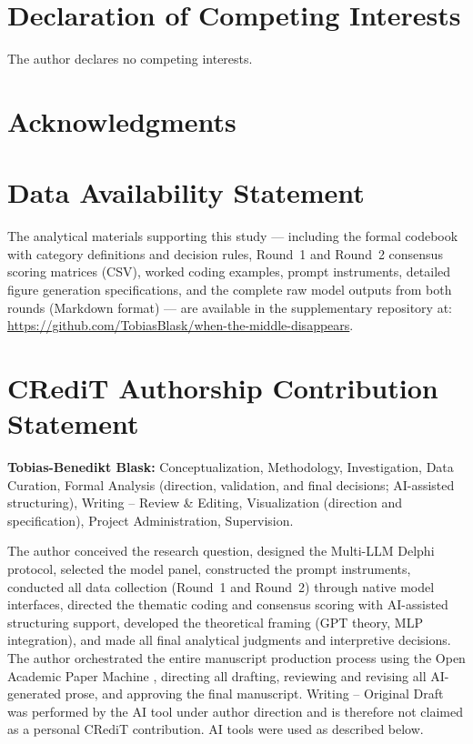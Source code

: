 \documentclass[preprint,review,12pt]{elsarticle}
\begin{document}
\section*{Declaration of Competing Interests}

The author declares no competing interests.

\section*{Acknowledgments}

\section*{Data Availability Statement}

The analytical materials supporting this study --- including the formal codebook with category definitions and decision rules, Round~1 and Round~2 consensus scoring matrices (CSV), worked coding examples, prompt instruments, detailed figure generation specifications, and the complete raw model outputs from both rounds (Markdown format) --- are available in the supplementary repository at: \url{https://github.com/TobiasBlask/when-the-middle-disappears}.

\section*{CRediT Authorship Contribution Statement}

\textbf{Tobias-Benedikt Blask:} Conceptualization, Methodology, Investigation, Data Curation, Formal Analysis (direction, validation, and final decisions; AI-assisted structuring), Writing -- Review \& Editing, Visualization (direction and specification), Project Administration, Supervision.

The author conceived the research question, designed the Multi-LLM Delphi protocol, selected the model panel, constructed the prompt instruments, conducted all data collection (Round~1 and Round~2) through native model interfaces, directed the thematic coding and consensus scoring with AI-assisted structuring support, developed the theoretical framing (GPT theory, MLP integration), and made all final analytical judgments and interpretive decisions. The author orchestrated the entire manuscript production process using the Open Academic Paper Machine \citep{blask2026openpapermachine}, directing all drafting, reviewing and revising all AI-generated prose, and approving the final manuscript. Writing -- Original Draft was performed by the AI tool under author direction and is therefore not claimed as a personal CRediT contribution. AI tools were used as described below.
\end{document}
